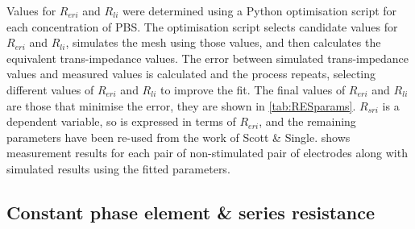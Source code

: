      Values for $R_{eri}$ and $R_{li}$ were determined using a Python optimisation script for each concentration of PBS.
      The optimisation script selects candidate values for $R_{eri}$ and $R_{li}$, simulates the mesh using those values, and then calculates the equivalent trans-impedance values.
      The error between simulated trans-impedance values and measured values is calculated and the process repeats, selecting different values of $R_{eri}$ and $R_{li}$ to improve the fit.
      The final values of $R_{eri}$ and $R_{li}$ are those that minimise the error, they are shown in \cref{tab:RESparams}.
      $R_{sri}$ is a dependent variable, so is expressed in terms of $R_{eri}$, and the remaining parameters have been re-used from the work of Scott \& Single.
       shows measurement results for each pair of non-stimulated pair of electrodes along with simulated results using the fitted parameters.


    \subsection{Constant phase element \& series resistance}


